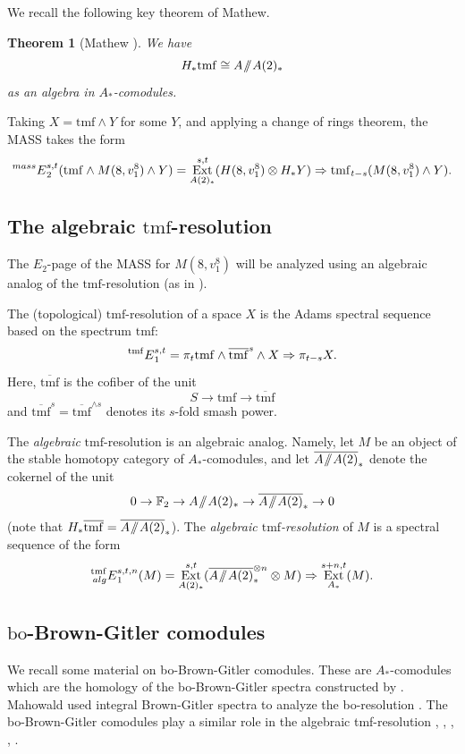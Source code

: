 \documentclass[10pt]{amsart}
\newcommand{\sslash}{\mathbin{/\mkern-6mu/}}
\newcommand{\mmod}{\! \sslash \!}
\newcommand{\br}[1]{\overline{#1}}
\newcommand{\FF}{\mathbb{F}}
\newcommand{\tmf}{\mathrm{tmf}}
\newcommand{\bo}{\mathrm{bo}}
\newtheorem{thm}[equation]{Theorem}
\theoremstyle{definition}
\numberwithin{equation}{section}
\numberwithin{figure}{section}
\DeclareMathOperator{\Ext}{Ext}
\newcommand{\E}[2]{\prescript{#1}{#2}{E}}
\begin{document}
We recall the following key theorem of Mathew.

\begin{thm}[Mathew \cite{Mathew}]
We have
$$ H_*\tmf \cong A\mmod A(2)_* $$
as an algebra in $A_*$-comodules.
\end{thm}

Taking $X = \tmf \wedge Y$ for some $Y$, and applying a change of rings theorem, the MASS takes the form
$$ \E{mass}{}_2^{s,t}(\tmf \wedge M(8,v_1^8) \wedge Y) = \Ext^{s,t}_{A(2)_*}(H(8,v_1^8) \otimes H_* Y) \Rightarrow \tmf_{t-s}(M(8,v_1^8) \wedge Y). $$

\subsection*{The algebraic $\tmf$-resolution}

The $E_2$-page of the MASS for $M(8,v_1^8)$ will be analyzed using an algebraic analog of the $\tmf$-resolution (as in \cite[Sec.~6]{BHHM2}).  

The (topological) $\tmf$-resolution of a space $X$ is the Adams spectral sequence based on the spectrum $\tmf$:
$$ \E{\tmf}{}_1^{s,t} = \pi_{t} \tmf \wedge \br{\tmf}^{s} \wedge X \Rightarrow \pi_{t-s} X. $$
Here, $\br{\tmf}$ is the cofiber of the unit
$$ S \rightarrow \tmf \rightarrow \br{\tmf} $$
and $\br{\tmf}^s = \br{\tmf}^{\wedge s}$ denotes its $s$-fold smash power. 

The \emph{algebraic} $\tmf$-resolution is an algebraic analog.
Namely, let $M$ be an object of the stable homotopy category of $A_*$-comodules, 
and let $\br{A\mmod A(2)}_*$ denote the cokernel of the unit
$$ 0 \rightarrow \FF_2 \rightarrow A\mmod A(2)_* \rightarrow \br{A \mmod A(2)}_* \rightarrow 0 $$
(note that $H_* \br{\tmf} = \br{A\mmod A(2)}_*$).
The \emph{algebraic $\tmf$-resolution} of $M$ is a spectral sequence of the form 
$$ \E{\tmf}{alg}_1^{s,t,n}(M) = \Ext^{s,t}_{A(2)_*}(\br{A\mmod A(2)}_*^{\otimes n} \otimes M) \Rightarrow \Ext^{s+n,t}_{A_*}(M). $$

\subsection*{$\bo$-Brown-Gitler comodules}\label{sec:boi}

We recall some material on bo-Brown-Gitler comodules.  These are $A_*$-comodules which are the homology of the bo-Brown-Gitler spectra constructed by \cite{GoerssJonesMahowald}.
Mahowald used integral Brown-Gitler spectra to analyze the bo-resolution \cite{Mahowaldbo}.  The bo-Brown-Gitler comodules play a similar role in the algebraic tmf-resolution \cite{BHHM}, \cite{MahowaldRezk}, \cite{DavisMahowald},  \cite{BOSS}, \cite{BHHM2}.  
\end{document}
